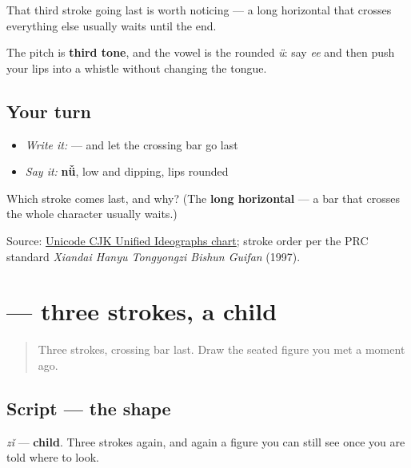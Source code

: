 That third stroke going last is worth noticing — a long horizontal that crosses everything else usually waits until the end.

The pitch is \textbf{third tone}, and the vowel is the rounded \emph{ü}: say \emph{ee} and then push your lips into a whistle without changing the tongue.

\subsection*{Your turn}
\begin{itemize}
\raggedright
  \item \emph{Write it:}  — and let the crossing bar go last
  \item \emph{Say it:} \textbf{nǚ}, low and dipping, lips rounded
\end{itemize}

\begin{tcolorbox}[breakable,colback=teal!4,colframe=teal!35!black,title={Before you move on}]
Which stroke comes last, and why? (The \textbf{long horizontal} — a bar that crosses the whole character usually waits.)

Source: \href{https://www.unicode.org/charts/PDF/U4E00.pdf}{Unicode CJK Unified Ideographs chart}; stroke order per the PRC standard \emph{Xiandai Hanyu Tongyongzi Bishun Guifan} (1997).
\end{tcolorbox}
\section[\texorpdfstring{\zh{子} (zǐ)}{子 (zǐ)}]{ — three strokes, a child}

\label{lesson:ZH-W01-zi}



\begin{quote}
Three strokes, crossing bar last. Draw the seated figure you met a moment ago.
\end{quote}

\subsection*{Script — the shape}

\begin{quote}
\end{quote}

\textbf{} \emph{zǐ} — \textbf{child}. Three strokes again, and again a figure you can still see once you are told where to look.

